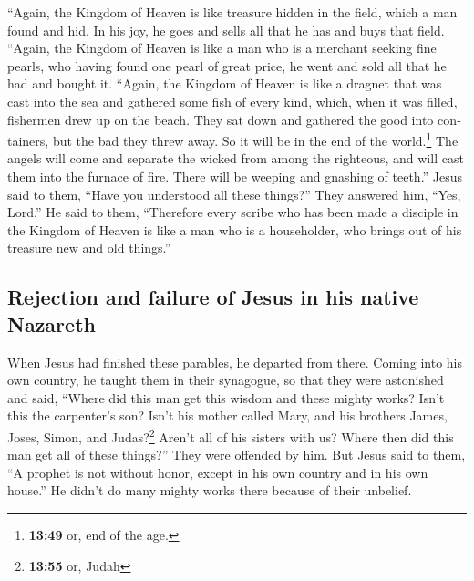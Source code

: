 \begin{paracol}{2}
\begin{otherlanguage}{english}
 ``Again, the Kingdom of Heaven is like treasure hidden
in the field, which a man found and hid. In his joy, he goes and sells
all that he has and buys that field.  ``Again, the
Kingdom of Heaven is like a man who is a merchant seeking fine pearls,
 who having found one pearl of great price, he went and
sold all that he had and bought it.  ``Again, the Kingdom
of Heaven is like a dragnet that was cast into the sea and gathered some
fish of every kind,  which, when it was filled, fishermen
drew up on the beach. They sat down and gathered the good into
containers, but the bad they threw away.  So it will be
in the end of the world.\footnote{\textbf{13:49} or, end of the age.}
The angels will come and separate the wicked from among the righteous,
 and will cast them into the furnace of fire. There will
be weeping and gnashing of teeth.''  Jesus said to them,
``Have you understood all these things?'' They answered him, ``Yes,
Lord.''  He said to them, ``Therefore every scribe who
has been made a disciple in the Kingdom of Heaven is like a man who is a
householder, who brings out of his treasure new and old things.''

\hypertarget{rejection-and-failure-of-jesus-in-his-native-nazareth}{%
\subsection{Rejection and failure of Jesus in his native
Nazareth}\label{rejection-and-failure-of-jesus-in-his-native-nazareth}}

 When Jesus had finished these parables, he departed from
there.  Coming into his own country, he taught them in
their synagogue, so that they were astonished and said, ``Where did this
man get this wisdom and these mighty works?  Isn't this
the carpenter's son? Isn't his mother called Mary, and his brothers
James, Joses, Simon, and Judas?\footnote{\textbf{13:55} or, Judah}
 Aren't all of his sisters with us? Where then did this
man get all of these things?''  They were offended by
him. But Jesus said to them, ``A prophet is not without honor, except in
his own country and in his own house.''  He didn't do
many mighty works there because of their unbelief.

\end{otherlanguage}


\end{paracol}
